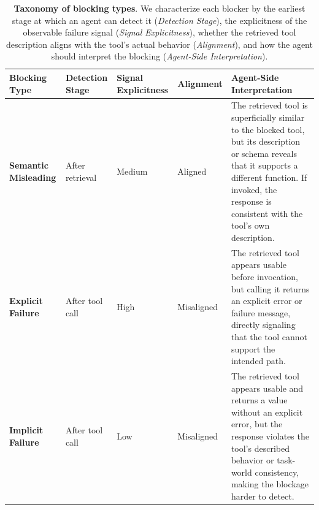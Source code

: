 \begin{table}[t]
\centering
\small
\setlength{\tabcolsep}{3.5pt}
\renewcommand{\arraystretch}{1.18}

\begin{tabularx}{\textwidth}{@{}
>{\raggedright\arraybackslash}p{}
>{\centering\arraybackslash}p{}
>{\centering\arraybackslash}p{}
>{\centering\arraybackslash}p{}
>{\raggedright\arraybackslash}X
@{}}
\toprule
\textbf{Blocking Type} &
\textbf{Detection Stage} &
\textbf{Signal Explicitness} &
\textbf{Alignment} &
\textbf{Agent-Side Interpretation} \\
\midrule

\textbf{Semantic Misleading} &
After retrieval &
Medium &
Aligned &
The retrieved tool is superficially similar to the blocked tool, but its description or schema reveals that it supports a different function. If invoked, the response is consistent with the tool's own description. \\

\textbf{Explicit Failure} &
After tool call &
High &
Misaligned &
The retrieved tool appears usable before invocation, but calling it returns an explicit error or failure message, directly signaling that the tool cannot support the intended path. \\

\textbf{Implicit Failure} &
After tool call &
Low &
Misaligned &
The retrieved tool appears usable and returns a value without an explicit error, but the response violates the tool's described behavior or task-world consistency, making the blockage harder to detect. \\

\bottomrule
\end{tabularx}

\caption{\textbf{Taxonomy of blocking types}. We characterize each blocker by the earliest stage at which an agent can detect it (\textit{Detection Stage}), the explicitness of the observable failure signal (\textit{Signal Explicitness}), whether the retrieved tool description aligns with the tool's actual behavior (\textit{Alignment}), and how the agent should interpret the blocking (\textit{Agent-Side Interpretation}).
}
\label{tab:blocking-comparison-tab}
\end{table}